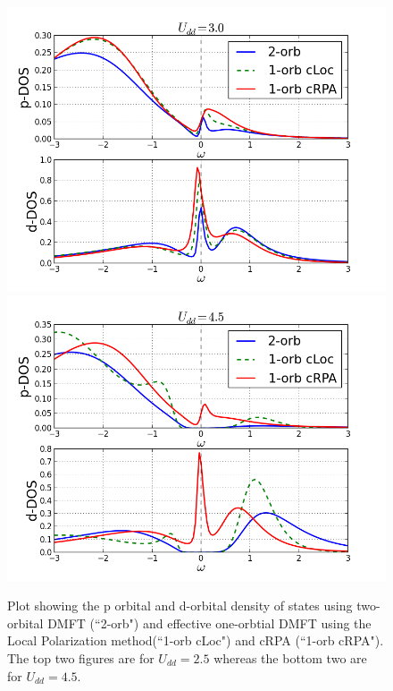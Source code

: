 \documentclass[10pt]{ruthesis}
\begin{document}
{\begin{figure}[H]
\begin{center}
 \includegraphics[width=0.80\columnwidth]{./plotForpublishing/pddoscmpUdd3_locW.png}
 \includegraphics[width=0.80\columnwidth]{./plotForpublishing/pddoscmpUdd4p5_locW.png}
 \end{center}
 \caption{\label{fig8}Plot showing the p orbital and d-orbital density of states using two-orbital DMFT (``2-orb") and  effective one-orbtial DMFT using the Local Polarization method(``1-orb cLoc") and cRPA (``1-orb cRPA"). The top two figures are for $U_{dd}=2.5$ whereas the bottom two are for $U_{dd}=4.5$.  }
\end{figure}

}
\end{document}
